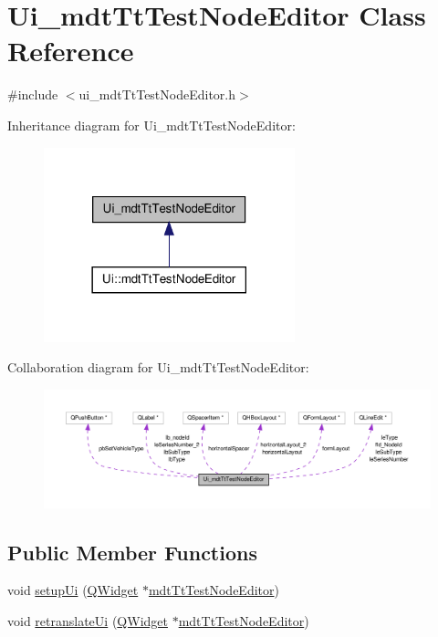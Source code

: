 \hypertarget{class_ui__mdt_tt_test_node_editor}{\section{Ui\-\_\-mdt\-Tt\-Test\-Node\-Editor Class Reference}
\label{class_ui__mdt_tt_test_node_editor}
}


{\ttfamily \#include $<$ui\-\_\-mdt\-Tt\-Test\-Node\-Editor.\-h$>$}



Inheritance diagram for Ui\-\_\-mdt\-Tt\-Test\-Node\-Editor\-:
\nopagebreak
\begin{figure}[H]
\begin{center}
\leavevmode
\includegraphics[width=206pt]{class_ui__mdt_tt_test_node_editor__inherit__graph}
\end{center}
\end{figure}


Collaboration diagram for Ui\-\_\-mdt\-Tt\-Test\-Node\-Editor\-:
\nopagebreak
\begin{figure}[H]
\begin{center}
\leavevmode
\includegraphics[width=350pt]{class_ui__mdt_tt_test_node_editor__coll__graph}
\end{center}
\end{figure}
\subsection*{Public Member Functions}
\begin{DoxyCompactItemize}
\item 
void \hyperlink{class_ui__mdt_tt_test_node_editor_a3aee4d826be297242bbecbf92f55e791}{setup\-Ui} (\hyperlink{class_q_widget}{Q\-Widget} $\ast$\hyperlink{classmdt_tt_test_node_editor}{mdt\-Tt\-Test\-Node\-Editor})
\item 
void \hyperlink{class_ui__mdt_tt_test_node_editor_aeaf446cfa9a8854cba44a1072a716133}{retranslate\-Ui} (\hyperlink{class_q_widget}{Q\-Widget} $\ast$\hyperlink{classmdt_tt_test_node_editor}{mdt\-Tt\-Test\-Node\-Editor})
\end{DoxyCompactItemize}
